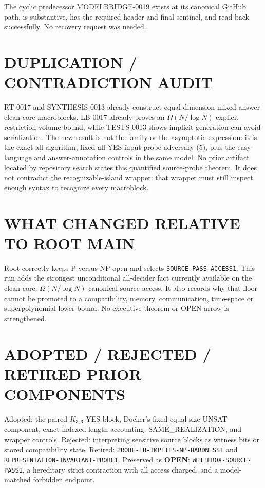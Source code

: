 \documentclass[11pt]{article}
\newcommand{\OPEN}{\textbf{OPEN}}
\begin{document}
The cyclic predecessor MODELBRIDGE-0019 exists at its canonical GitHub path,
is substantive, has the required header and final sentinel, and read back
successfully.  No recovery request was needed.

\section{DUPLICATION / CONTRADICTION AUDIT}

RT-0017 and SYNTHESIS-0013 already construct equal-dimension mixed-answer
clean-core macroblocks.  LB-0017 already proves an $\Omega(N/\log N)$ explicit
restriction-volume bound, while TESTS-0013 shows implicit generation can avoid
serialization.  The new result is not the family or the asymptotic expression:
it is the exact all-algorithm, fixed-all-YES input-probe adversary (5), plus the
easy-language and answer-annotation controls in the same model.  No prior
artifact located by repository search states this quantified source-probe
theorem.  It does not contradict the recognizable-island wrapper: that wrapper
must still inspect enough syntax to recognize every macroblock.

\section{WHAT CHANGED RELATIVE TO ROOT MAIN}

Root  correctly keeps P versus NP open and selects
\texttt{SOURCE-PASS-ACCESS1}.  This run adds the strongest unconditional
all-decider fact currently available on the clean core:
$\Omega(N/\log N)$ canonical-source access.  It also records why that floor
cannot be promoted to a compatibility, memory, communication, time-space or
superpolynomial lower bound.  No executive theorem or OPEN arrow is
strengthened.

\section{ADOPTED / REJECTED / RETIRED PRIOR COMPONENTS}

Adopted: the paired $K_{3,3}$ YES block, D\"ocker's fixed equal-size UNSAT
component, exact indexed-length accounting, SAME\_REALIZATION, and wrapper
controls.  Rejected: interpreting sensitive source blocks as witness bits or
stored compatibility state.  Retired: \texttt{PROBE-LB-IMPLIES-NP-HARDNESS1}
and \texttt{REPRESENTATION-INVARIANT-PROBE1}.  Preserved as \OPEN:
\texttt{WHITEBOX-SOURCE-PASS1}, a hereditary strict contraction with all access
charged, and a model-matched forbidden endpoint.
\end{document}
